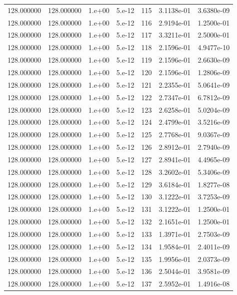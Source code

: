 \begin{table}[htbp]
\begin{tabular}{rrrrrrr}
128.000000 & 128.000000 & 1.e+00 & 5.e-12 & 115 & 3.1138e-01 & 3.6380e-09 \\
128.000000 & 128.000000 & 1.e+00 & 5.e-12 & 116 & 2.9194e-01 & 1.2500e-01 \\
128.000000 & 128.000000 & 1.e+00 & 5.e-12 & 117 & 3.3211e-01 & 2.5000e-01 \\
128.000000 & 128.000000 & 1.e+00 & 5.e-12 & 118 & 2.1596e-01 & 4.9477e-10 \\
128.000000 & 128.000000 & 1.e+00 & 5.e-12 & 119 & 2.1596e-01 & 2.6630e-09 \\
128.000000 & 128.000000 & 1.e+00 & 5.e-12 & 120 & 2.1596e-01 & 1.2806e-09 \\
128.000000 & 128.000000 & 1.e+00 & 5.e-12 & 121 & 2.2355e-01 & 5.0641e-09 \\
128.000000 & 128.000000 & 1.e+00 & 5.e-12 & 122 & 2.7347e-01 & 6.7812e-09 \\
128.000000 & 128.000000 & 1.e+00 & 5.e-12 & 123 & 2.6258e-01 & 5.0204e-09 \\
128.000000 & 128.000000 & 1.e+00 & 5.e-12 & 124 & 2.4799e-01 & 3.5216e-09 \\
128.000000 & 128.000000 & 1.e+00 & 5.e-12 & 125 & 2.7768e-01 & 9.0367e-09 \\
128.000000 & 128.000000 & 1.e+00 & 5.e-12 & 126 & 2.8912e-01 & 2.7940e-09 \\
128.000000 & 128.000000 & 1.e+00 & 5.e-12 & 127 & 2.8941e-01 & 4.4965e-09 \\
128.000000 & 128.000000 & 1.e+00 & 5.e-12 & 128 & 3.2602e-01 & 5.3406e-09 \\
128.000000 & 128.000000 & 1.e+00 & 5.e-12 & 129 & 3.6184e-01 & 1.8277e-08 \\
128.000000 & 128.000000 & 1.e+00 & 5.e-12 & 130 & 3.1222e-01 & 3.7253e-09 \\
128.000000 & 128.000000 & 1.e+00 & 5.e-12 & 131 & 3.1222e-01 & 1.2500e-01 \\
128.000000 & 128.000000 & 1.e+00 & 5.e-12 & 132 & 2.1651e-01 & 1.2500e-01 \\
128.000000 & 128.000000 & 1.e+00 & 5.e-12 & 133 & 1.3971e-01 & 2.7503e-09 \\
128.000000 & 128.000000 & 1.e+00 & 5.e-12 & 134 & 1.9584e-01 & 2.4011e-09 \\
128.000000 & 128.000000 & 1.e+00 & 5.e-12 & 135 & 1.9956e-01 & 2.0373e-09 \\
128.000000 & 128.000000 & 1.e+00 & 5.e-12 & 136 & 2.5044e-01 & 3.9581e-09 \\
128.000000 & 128.000000 & 1.e+00 & 5.e-12 & 137 & 2.5952e-01 & 1.4916e-08 \\

\end{tabular}
\end{table}
